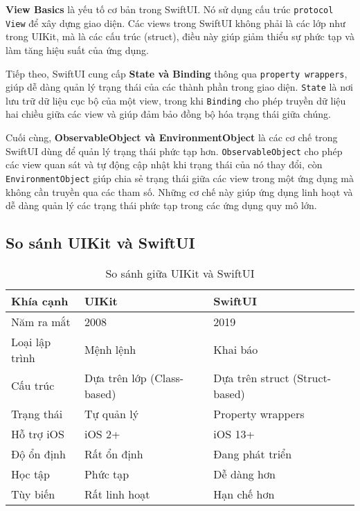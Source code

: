 \vspace{0.5em}

\textbf{View Basics} là yếu tố cơ bản trong SwiftUI. Nó sử dụng cấu trúc \texttt{protocol View} để xây dựng giao diện. Các views trong SwiftUI không phải là các lớp như trong UIKit, mà là các cấu trúc (struct), điều này giúp giảm thiểu sự phức tạp và làm tăng hiệu suất của ứng dụng.

\vspace{0.5em}

Tiếp theo, SwiftUI cung cấp \textbf{State và Binding} thông qua \texttt{property wrappers}, giúp dễ dàng quản lý trạng thái của các thành phần trong giao diện. \texttt{State} là nơi lưu trữ dữ liệu cục bộ của một view, trong khi \texttt{Binding} cho phép truyền dữ liệu hai chiều giữa các view và giúp đảm bảo đồng bộ hóa trạng thái giữa chúng.

\vspace{0.5em}

Cuối cùng, \textbf{ObservableObject và EnvironmentObject} \cite{ObservableObject} là các cơ chế trong SwiftUI dùng để quản lý trạng thái phức tạp hơn. \texttt{ObservableObject} cho phép các view quan sát và tự động cập nhật khi trạng thái của nó thay đổi, còn \texttt{EnvironmentObject} giúp chia sẻ trạng thái giữa các view trong một ứng dụng mà không cần truyền qua các tham số. Những cơ chế này giúp ứng dụng linh hoạt và dễ dàng quản lý các trạng thái phức tạp trong các ứng dụng quy mô lớn.

\subsection{So sánh UIKit và SwiftUI}

\begin{table}[H] %
\centering
\begin{tabular}{|l|l|l|}
\hline
\textbf{Khía cạnh} & \textbf{UIKit} & \textbf{SwiftUI} \\
\hline
Năm ra mắt & 2008 & 2019 \\
\hline
Loại lập trình & Mệnh lệnh & Khai báo \\
\hline
Cấu trúc & Dựa trên lớp (Class-based) & Dựa trên struct (Struct-based) \\
\hline
Trạng thái & Tự quản lý & Property wrappers \\
\hline
Hỗ trợ iOS & iOS 2+ & iOS 13+ \\
\hline
Độ ổn định & Rất ổn định & Đang phát triển \\
\hline
Học tập & Phức tạp & Dễ dàng hơn \\
\hline
Tùy biến & Rất linh hoạt & Hạn chế hơn \\
\hline
\end{tabular}
\caption{So sánh giữa UIKit và SwiftUI}
\end{table}
